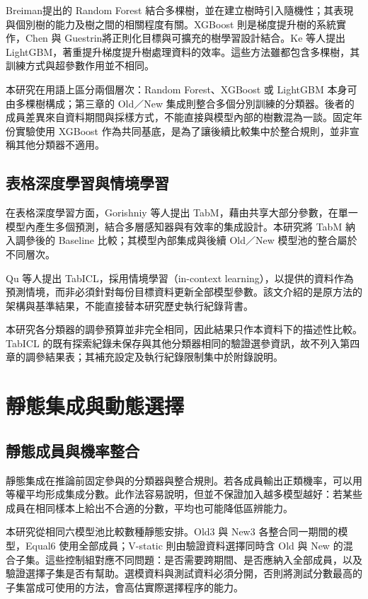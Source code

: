 Breiman\autocite{breiman2001rf}提出的 Random Forest 結合多棵樹，並在建立樹時引入隨機性；其表現與個別樹的能力及樹之間的相關程度有關。XGBoost 則是梯度提升樹的系統實作，Chen 與 Guestrin\autocite{chen2016xgboost}將正則化目標與可擴充的樹學習設計結合。Ke 等人\autocite{ke2017lightgbm}提出 LightGBM，著重提升梯度提升樹處理資料的效率。這些方法雖都包含多棵樹，其訓練方式與超參數作用並不相同。

本研究在用語上區分兩個層次：Random Forest、XGBoost 或 LightGBM 本身可由多棵樹構成；第三章的 Old／New 集成則整合多個分別訓練的分類器。後者的成員差異來自資料期間與採樣方式，不能直接與模型內部的樹數混為一談。固定年份實驗使用 XGBoost 作為共同基底，是為了讓後續比較集中於整合規則，並非宣稱其他分類器不適用。

\subsection{表格深度學習與情境學習}

在表格深度學習方面，Gorishniy 等人\autocite{gorishniy2025tabm}提出 TabM，藉由共享大部分參數，在單一模型內產生多個預測，結合多層感知器與有效率的集成設計。本研究將 TabM 納入調參後的 Baseline 比較；其模型內部集成與後續 Old／New 模型池的整合屬於不同層次。

Qu 等人\autocite{qu2025tabicl}提出 TabICL，採用情境學習（in-context learning），以提供的資料作為預測情境，而非必須針對每份目標資料更新全部模型參數。該文介紹的是原方法的架構與基準結果，不能直接替本研究歷史執行紀錄背書。

本研究各分類器的調參預算並非完全相同，因此結果只作本資料下的描述性比較。TabICL 的既有探索紀錄未保存與其他分類器相同的驗證選參資訊，故不列入第四章的調參結果表；其補充設定及執行紀錄限制集中於附錄說明。

\section{靜態集成與動態選擇}

\subsection{靜態成員與機率整合}

靜態集成在推論前固定參與的分類器與整合規則。若各成員輸出正類機率，可以用等權平均形成集成分數。此作法容易說明，但並不保證加入越多模型越好：若某些成員在相同樣本上給出不合適的分數，平均也可能降低區辨能力。

本研究從相同六模型池比較數種靜態安排。Old3 與 New3 各整合同一期間的模型，Equal6 使用全部成員；V-static 則由驗證資料選擇同時含 Old 與 New 的混合子集。這些控制組對應不同問題：是否需要跨期間、是否應納入全部成員，以及驗證選擇子集是否有幫助。選模資料與測試資料必須分開，否則將測試分數最高的子集當成可使用的方法，會高估實際選擇程序的能力。

